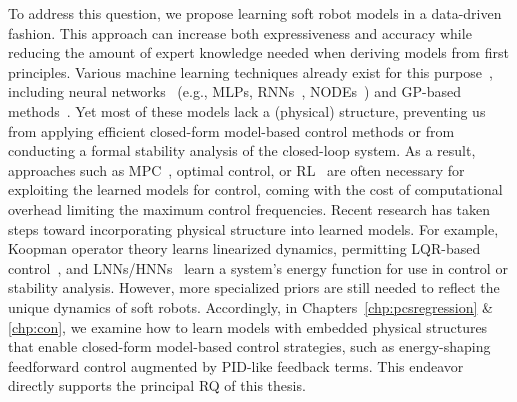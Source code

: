 To address this question, we propose learning soft robot models in a data-driven fashion. This approach can increase both expressiveness and accuracy while reducing the amount of expert knowledge needed when deriving models from first principles. Various machine learning techniques already exist for this purpose~\citep{armanini2023soft, kim2021review, chen2024data}, including neural networks~\citep{thuruthel2017learning} (e.g., \glspl{MLP}, \glspl{RNN}~\citep{schafke2024learning}, \glspl{NODE}~\citep{chen2018neural, kidger2021neural}) and \gls{GP}-based methods~\citep{sabelhaus2021gaussian}. Yet most of these models lack a (physical) structure, preventing us from applying efficient closed-form model-based control methods or from conducting a formal stability analysis of the closed-loop system. As a result, approaches such as \gls{MPC}~\citep{gillespie2018learning, alora2023robust, schafke2024learning}, optimal control, or \gls{RL}~\citep{thuruthel2018model} are often necessary for exploiting the learned models for control, coming with the cost of computational overhead limiting the maximum control frequencies.
%
Recent research has taken steps toward incorporating physical structure into learned models. For example, Koopman operator theory learns linearized dynamics, permitting \gls{LQR}-based control~\citep{bruder2020data}, and \glspl{LNN}/\glspl{HNN}~\citep{lutter2019deep} learn a system’s energy function for use in control or stability analysis. However, more specialized priors are still needed to reflect the unique dynamics of soft robots. Accordingly, in Chapters~\ref{chp:pcsregression} \& \ref{chp:con}, we examine how to learn models with embedded physical structures that enable closed-form model-based control strategies, such as energy-shaping feedforward control augmented by PID-like feedback terms. This endeavor directly supports the principal \gls{RQ} of this thesis.


